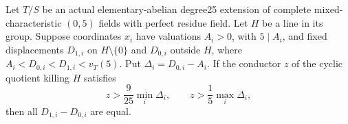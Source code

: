 \begin{lemma}
\label{lem:B-RD96-gap}
Let $T/S$ be an actual elementary-abelian degree25 extension of
complete mixed-characteristic $(0,5)$ fields with perfect residue
field. Let $H$ be a line in its group. Suppose coordinates $x_i$
have valuations $A_i>0$, with $5\mid A_i$, and fixed displacements
$D_{1,i}$ on $H\setminus\{0\}$ and $D_{0,i}$ outside $H$, where
$A_i<D_{0,i}<D_{1,i}<v_T(5)$. Put $\Delta_i=D_{0,i}-A_i$.
If the conductor $z$ of the cyclic quotient killing $H$ satisfies
\[
 z>\frac9{25}\min_i\Delta_i,
 \qquad z>\frac15\max_i\Delta_i,
                                                        \tag{B-RD96.15}
\]
then all $D_{1,i}-D_{0,i}$ are equal.
\end{lemma}
